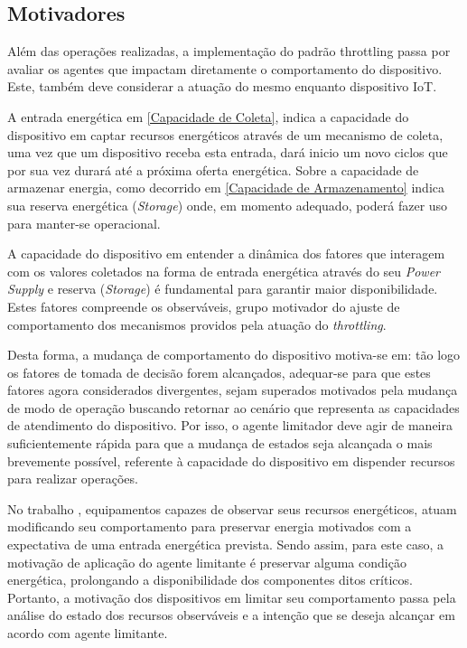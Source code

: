 \subsection{Motivadores}

Além das operações realizadas, a implementação do padrão throttling passa por avaliar os agentes que impactam diretamente o comportamento do dispositivo. Este, também deve considerar a atuação do mesmo enquanto dispositivo \acs{IoT}. 

A entrada energética em \ref{Capacidade de Coleta}, indica a capacidade do dispositivo em captar recursos energéticos através de um mecanismo de coleta, uma vez que um dispositivo receba esta entrada, dará inicio um novo ciclos que por sua vez durará até a próxima oferta energética. Sobre a capacidade de armazenar energia, como decorrido em \ref{Capacidade de Armazenamento} indica sua reserva energética (\textit{Storage}) onde, em momento adequado, poderá fazer uso para manter-se operacional.  

A capacidade do dispositivo em entender a dinâmica dos fatores que interagem com os valores coletados na forma de entrada energética através do seu \textit{Power Supply} e reserva (\textit{Storage}) é fundamental para garantir maior disponibilidade. Estes fatores compreende os observáveis, grupo motivador do ajuste de comportamento dos mecanismos providos pela atuação do \textit{throttling}. 

Desta forma, a mudança de comportamento do dispositivo motiva-se em: tão logo os fatores de tomada de decisão forem alcançados, adequar-se para que estes fatores agora considerados divergentes, sejam superados motivados pela mudança de modo de operação buscando retornar ao cenário que representa as capacidades de atendimento do dispositivo.   Por isso, o agente limitador deve agir de maneira suficientemente rápida para que a mudança de estados seja alcançada o mais brevemente possível, referente à capacidade do dispositivo em dispender recursos para realizar operações. 

No trabalho \cite{zhang_toward_2018}, equipamentos capazes de observar seus recursos energéticos, atuam modificando seu comportamento para preservar energia motivados com a expectativa de uma entrada energética prevista. Sendo assim, para este caso, a motivação de aplicação do agente limitante é preservar alguma condição energética, prolongando a disponibilidade dos componentes ditos críticos. Portanto, a motivação dos dispositivos em limitar seu comportamento passa pela análise do estado dos recursos observáveis e a intenção que se deseja alcançar em acordo com agente limitante.

